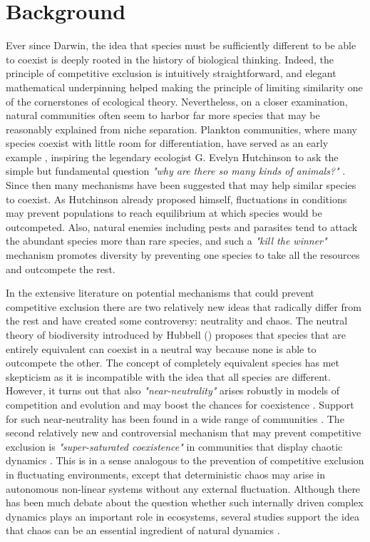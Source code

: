 \section{Background}
\label{sec:Background}
Ever since Darwin, the idea that species must be sufficiently different to be able to coexist is deeply rooted in the history of biological thinking. Indeed, the principle of competitive exclusion \citep{Hardin1960} is intuitively straightforward, and elegant mathematical underpinning \citep{MacArthur} helped making the principle of limiting similarity one of the cornerstones of ecological theory. Nevertheless, on a closer examination, natural communities often seem to harbor far more species that may be reasonably explained from niche separation. Plankton communities, where many species coexist with little room for differentiation, have served as an early example \citep{Hutchinson, Hutchinson1961}, inspiring the legendary ecologist G. Evelyn Hutchinson to ask the simple but fundamental question \textit{"why are there so many kinds of animals?"} \citep{Hutchinson}. Since then many mechanisms have been suggested that may help similar species to coexist. As Hutchinson already proposed himself, fluctuations in conditions may prevent populations to reach equilibrium at which species would be outcompeted. Also, natural enemies including pests and parasites tend to attack the abundant species more than rare species, and such a \textit{"kill the winner"} \citep{Winter2010} mechanism promotes diversity by preventing one species to take all the resources and outcompete the rest.

In the extensive literature on potential mechanisms that could prevent competitive exclusion there are two relatively new ideas that radically differ from the rest and have created some controversy: neutrality and chaos. The neutral theory of biodiversity introduced by Hubbell (\citeyear{Hubbell2001}) proposes that species that are entirely equivalent can coexist in a neutral way because none is able to outcompete the other. The concept of completely equivalent species has met skepticism as it is incompatible with the idea that all species are different. However, it turns out that also \textit{"near-neutrality"} arises robustly in models of competition and evolution and may boost the chances for coexistence \citep{Scheffer2006, Scheffer2018, Fort2009, Fort2010}. Support for such near-neutrality has been found in a wide range of communities \citep{Scheffer2006, Vergnon2013, Scheffera, Segura2013, Vergnon2012}. The second relatively new and controversial mechanism that may prevent competitive exclusion is \textit{"super-saturated coexistence"} in communities that display chaotic dynamics \citep{Huisman1999}. This is in a sense analogous to the prevention of competitive exclusion in fluctuating environments, except that deterministic chaos may arise in autonomous non-linear systems without any external fluctuation. Although there has been much debate about the question whether such internally driven complex dynamics plays an important role in ecosystems, several studies support the idea that chaos can be an essential ingredient of natural dynamics \citep{Armstrong1980, Huisman1999, Beninca2008, Dakos2009b}.

